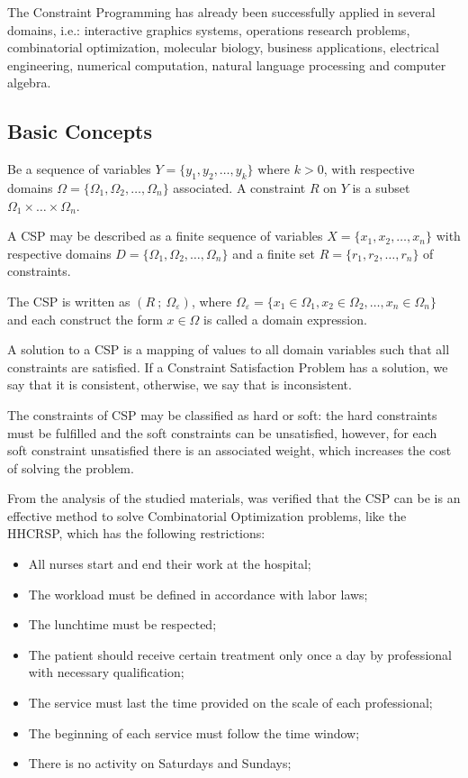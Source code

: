 The Constraint Programming has already been successfully applied in several domains, i.e.: interactive graphics systems, operations research problems, combinatorial optimization, molecular biology, business applications, electrical engineering, numerical computation, natural language processing and computer algebra. 

\subsection{Basic Concepts}

Be a sequence of variables $Y = \{ y_1, y_2, \dots, y_k \}$ where $k>0$, with respective domains  $\Omega = \{\Omega_1, \Omega_2, \dots, \Omega_n\}$ associated. A constraint $R$ on $Y$ is a subset $\Omega_1 \times \dots \times \Omega_n$. 

A \acl{CSP} may be described as a finite sequence of variables $X = \{x_1, x_2, \dots, x_n\}$ with respective domains $D = \{\Omega_1, \Omega_2, \dots, \Omega_n\}$ and a finite set $R = \{ r_1, r_2, \dots, r_n \}$ of constraints.

The \ac{CSP} is written as $(R~;~\Omega_\varepsilon)$, where $\Omega_\varepsilon = \{x_1 \in \Omega_1, x_2 \in \Omega_2, \dots, x_n \in \Omega_n \}$ and each construct the form $x \in \Omega$ is called a domain expression.

A solution to a \ac{CSP} is a mapping of values to all domain variables such that all constraints are satisfied. 
If a Constraint Satisfaction Problem has a solution, we say that it is consistent, otherwise, we say that is inconsistent\cite{Krzysztof:2003}.

The constraints of \ac{CSP} may be classified as hard or soft: the hard constraints must be fulfilled and the soft constraints can be unsatisfied, however, for each soft constraint unsatisfied there is an associated weight, which increases the cost of solving the problem.

From the analysis of the studied materials, was verified that the \ac{CSP} can be is an effective method to solve Combinatorial Optimization problems, like the  \ac{HHCRSP}, which has the following restrictions:
\begin{itemize}
\item All nurses start and end their work at the hospital;
\item The workload must be defined in accordance with labor laws;
\item The lunchtime must be respected;
\item The patient should receive certain treatment only once a day by  professional with necessary qualification;
\item The service must last the time provided on the scale of each professional;
\item The beginning of each service must follow the time window;
\item There is no activity on Saturdays and Sundays;
\end{itemize}

